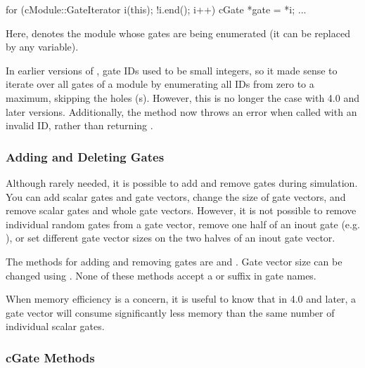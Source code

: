 \begin{cpp}
for (cModule::GateIterator i(this); !i.end(); i++) {
    cGate *gate = *i;
    ...
}
\end{cpp}

Here,  denotes the module whose gates are being enumerated
(it can be replaced by any  variable).

\begin{note}
    In earlier versions of {\opp}, gate IDs used to be small integers, so
    it made sense to iterate over all gates of a module by enumerating
    all IDs from zero to a maximum, skipping the holes (s).
    However, this is no longer the case with {\opp} 4.0 and later versions.
    Additionally, the  method now throws an error when called
    with an invalid ID, rather than returning .
\end{note}


\subsubsection{Adding and Deleting Gates}
\label{sec:simple-modules:adding-and-deleting-gates}

Although rarely needed, it is possible to add and remove gates during
simulation. You can add scalar gates and gate vectors, change the size of
gate vectors, and remove scalar gates and whole gate vectors.
However, it is not possible to remove individual random gates from a gate vector,
remove one half of an inout gate (e.g. ), or set
different gate vector sizes on the two halves of an inout gate vector.

The  methods for adding and removing gates are
 and .
Gate vector size can be changed using .
None of these methods accept a  or  suffix in gate names.

\begin{note}
    When memory efficiency is a concern, it is useful to know that
    in {\opp} 4.0 and later, a gate vector will consume significantly less
    memory than the same number of individual scalar gates.
\end{note}


\subsubsection{cGate Methods}
\label{sec:simple-modules:cgate-methods}

